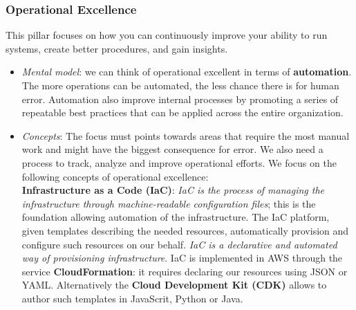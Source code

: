\documentclass{article}
\theoremstyle{definition}
\begin{document}
\subsubsection{Operational Excellence}
This pillar focuses on how you can continuously improve your ability to run systems, create better procedures, and gain insights.
\begin{itemize}
    \item \textit{Mental model}: we can think of operational excellent in terms of \textbf{automation}. The more operations can be automated, the less chance there is for human error. Automation also improve internal processes by promoting a series of repeatable best practices that can be applied across the entire organization.\\
    
    \item \textit{Concepts}: The focus must points towards areas that require the most manual work and might have the biggest consequence for error. We also need a process to track, analyze and improve operational efforts. We focus on the following concepts of operational excellence:\\
    
    
    \textbf{Infrastructure as a Code (IaC)}: \textit{IaC is the process of managing the infrastructure through machine-readable configuration files}; this is the foundation allowing automation of the infrastructure. The IaC platform, given templates describing the needed resources, automatically provision and configure such resources on our behalf. \textit{IaC is a declarative and automated way of provisioning infrastructure}. IaC is implemented in AWS through the service \textbf{CloudFormation}: it requires declaring our resources using JSON or YAML. Alternatively the \textbf{Cloud Development Kit (CDK)} allows to author such templates in JavaScrit, Python or Java.\\
    

\end{itemize}
\end{document}

